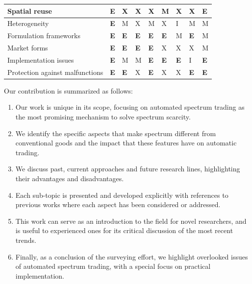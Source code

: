 \begin{landscape}
\begin{table}
\begin{tabular}{|p{5cm}|c*{7}{x{1.5cm}}|}
\hline
Spatial reuse														&	\textbf{E} 		& X 											& X 														& X 										 & M											 & X 									& X 										& \textbf{E} \\
\hline
Heterogeneity														&	\textbf{E} 		& M 											& X 														& M 										 & X											 & I 									& M 										& M \\
\hline
Formulation frameworks									&	\textbf{E}	  & \textbf{E}							& \textbf{E} 									  & \textbf{E} 						 & \textbf{E}							 & M 									& \textbf{E} 						& M \\
\hline
Market forms														&	\textbf{E} 		& \textbf{E} 							& \textbf{E} 										& \textbf{E} 						 & X											 & X 									& X 										& M \\
\hline
Implementation issues										&	\textbf{E} 		& M 											& M 														& \textbf{E} 						 & \textbf{E}							 & \textbf{E} 				& I 										& \textbf{E} \\
\hline
Protection against malfunctions					&	\textbf{E} 		& \textbf{E} 							& X 														& \textbf{E} 						 & X											 & X 									& \textbf{E} 						& \textbf{E} \\
\hline				
\end{tabular}
\end{table}
\end{landscape}
Our contribution is summarized as follows:
\begin{enumerate}[I]
\item Our work is unique in its scope, focusing on automated spectrum trading as the most promising mechanism to solve spectrum scarcity.
\item We identify the specific aspects that make spectrum different from conventional goods and the impact that these features have on automatic trading.
\item We discuss past, current approaches and future research lines, highlighting their advantages and disadvantages. 
\item Each sub-topic is presented and developed explicitly with references to previous works where each aspect has been considered or addressed.
\item This work can serve as an introduction to the field for novel researchers, and is useful to experienced ones for its critical discussion of the most recent trends.
\item Finally, as a conclusion of the surveying effort, we highlight overlooked issues of automated spectrum trading, with a special focus on practical implementation.
\end{enumerate}

